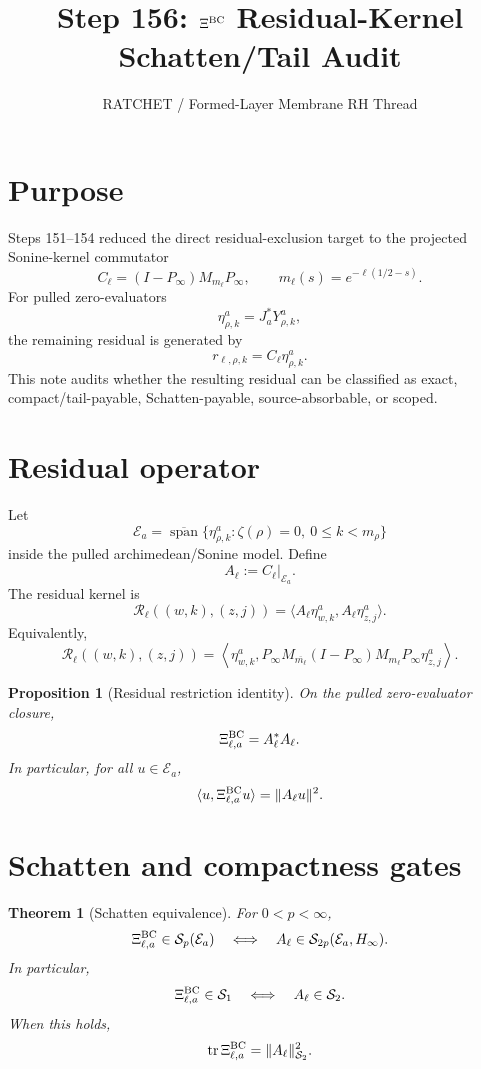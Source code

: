 \documentclass[11pt]{article}
\title{Step 156: $\Xi^{\rm BC}$ Residual-Kernel Schatten/Tail Audit}
\author{RATCHET / Formed-Layer Membrane RH Thread}
\date{}
\newtheorem{theorem}{Theorem}
\newtheorem{proposition}{Proposition}
\begin{document}
\maketitle

\section{Purpose}
Steps 151--154 reduced the direct residual-exclusion target to the projected Sonine-kernel commutator
\[
  C_\ell=(I-P_\infty)M_{m_\ell}P_\infty,
  \qquad m_\ell(s)=e^{-\ell(1/2-s)}.
\]
For pulled zero-evaluators
\[
  \eta^a_{\rho,k}=J_a^*Y^a_{\rho,k},
\]
the remaining residual is generated by
\[
  r_{\ell,\rho,k}=C_\ell \eta^a_{\rho,k}.
\]
This note audits whether the resulting residual can be classified as exact, compact/tail-payable, Schatten-payable, source-absorbable, or scoped.

\section{Residual operator}
Let
\[
  \mathcal E_a=\overline{\operatorname{span}}\{\eta^a_{\rho,k}: \zeta(\rho)=0,\ 0\le k<m_\rho\}
\]
inside the pulled archimedean/Sonine model. Define
\[
  A_\ell := C_\ell\big|_{\mathcal E_a}.
\]
The residual kernel is
\[
  \mathcal R_\ell((w,k),(z,j))
  =\langle A_\ell\eta^a_{w,k}, A_\ell\eta^a_{z,j}\rangle.
\]
Equivalently,
\[
  \mathcal R_\ell((w,k),(z,j))
  =\left\langle
  \eta^a_{w,k},
  P_\infty M_{\overline{m_\ell}}(I-P_\infty)M_{m_\ell}P_\infty
  \eta^a_{z,j}
  \right\rangle.
\]

\begin{proposition}[Residual restriction identity]
On the pulled zero-evaluator closure,
\[
  \Xi^{\rm BC}_{\ell,a}=A_\ell^*A_\ell.
\]
In particular, for all $u\in\mathcal E_a$,
\[
  \langle u,\Xi^{\rm BC}_{\ell,a}u\rangle=\|A_\ell u\|^2.
\]
\end{proposition}

\section{Schatten and compactness gates}
\begin{theorem}[Schatten equivalence]
For $0<p<\infty$,
\[
  \Xi^{\rm BC}_{\ell,a}\in\mathcal S_p(\mathcal E_a)
  \quad\Longleftrightarrow\quad
  A_\ell\in\mathcal S_{2p}(\mathcal E_a,H_\infty).
\]
In particular,
\[
  \Xi^{\rm BC}_{\ell,a}\in\mathcal S_1
  \quad\Longleftrightarrow\quad
  A_\ell\in\mathcal S_2.
\]
When this holds,
\[
  \operatorname{tr}\Xi^{\rm BC}_{\ell,a}=\|A_\ell\|_{\mathcal S_2}^2.
\]
\end{theorem}
\end{document}
